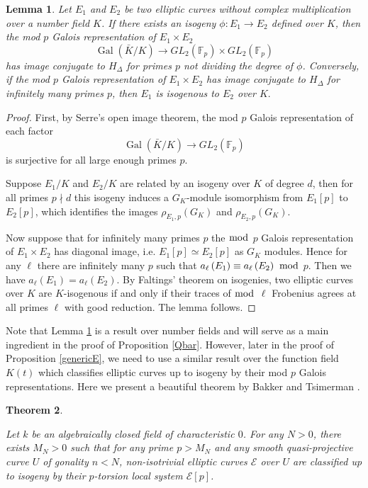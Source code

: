 \documentclass[12pt]{amsart}
\newtheorem{thm}{Theorem}[section]
\newtheorem{lem}[thm]{Lemma}
\theoremstyle{definition}
\theoremstyle{remark}
\numberwithin{equation}{section}
\newcommand{\F}{\mathbb{F}}
\DeclareMathOperator{\Gal}{Gal}
\begin{document}
\begin{lem}\label{iso}
	Let $E_{1}$ and $E_{2}$ be two elliptic curves without complex multiplication over a number field $K$. If there exists an isogeny $\phi: E_{1} \to E_{2}$ defined over $K$, then the mod $p$ Galois representation of $E_{1} \times E_{2}$
	$$\Gal(\bar{K}/K) \to GL_{2}(\F_{p}) \times GL_{2}(\F_{p})$$ 
	has image conjugate to $H_{\Delta}$ for primes $p$ not dividing the degree of $\phi$. Conversely, if the mod $p$ Galois representation of $E_{1} \times E_{2}$ has image conjugate to $H_{\Delta}$ for infinitely many primes $p$, then $E_1$ is isogenous to $E_2$ over $K.$
	
\end{lem}
 \begin{proof}
 
 First, by Serre's open image theorem, the mod $p$ Galois representation of each factor
 $$\Gal(\bar{K}/K) \to GL_{2}(\F_{p})$$
 is surjective for all large enough primes $p$.
  
 Suppose $E_{1}/K$ and $E_{2} / K$ are related by an isogeny over $K$ of degree $d$, then for all primes $p \nmid d$ this isogeny induces a $G_{K}$-module isomorphism from $E_{1}[p]$ to $E_{2}[p]$, which identifies the images $\rho_{E_{1}, p}\left(G_{K}\right)$ and $\rho_{E_{2}, p}(G_{K})$. 
 
 Now suppose that for infinitely many primes $p$ the $\bmod$ $p$ Galois representation of $E_1 \times E_2$ has diagonal image, i.e. $E_1[p] \simeq E_2[p]$ as $G_K$ modules. Hence for any $\ell$ there are infinitely many $p$ such that $a_{\ell}\left(E_1\right) \equiv a_{\ell}\left(E_2\right) \text{ } \bmod $ $p$. Then we have $a_{\ell}\left(E_1\right)=a_{\ell}\left(E_2\right)$. By Faltings' theorem on isogenies, two elliptic curves over $K$ are $K$-isogenous if and only if their traces of $\bmod$ $\ell$ Frobenius agrees at all primes $\ell$ with good reduction. The lemma follows.   

\end{proof}
 
 Note that Lemma \ref{iso} is a result over number fields and will serve as a main ingredient in the proof of Proposition \ref{Qbar}. However, later in the proof of Proposition \ref{genericE}, we need to use a similar result over the function field $K(t)$ which classifies elliptic curves up to isogeny by their mod $p$ Galois representations. Here we present a beautiful theorem by Bakker and Tsimerman \cite[Theorem 1]{BT}.
 \begin{thm}\label{Bakker and Tsimerman}
 	
 Let $k$ be an algebraically closed field of characteristic $0$. For any $N > 0$, there exists $M_N > 0$ such that for any prime $p > M_N$ and any smooth quasi-projective curve $U$ of gonality $n<N$, non-isotrivial elliptic curves $\mathcal{E}$ over $U$ are classified up to isogeny by their $p$-torsion local system $\mathcal{E}[p]$.
 \end{thm}
\end{document}
